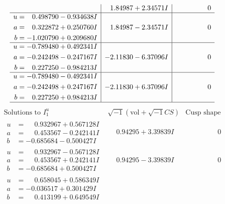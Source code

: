 \documentclass[1p]{elsarticle_modified}
\theoremstyle{definition}
\newcommand{\I}{\sqrt{-1}}
\begin{document}
$$\begin{array}{c|c|c}
 & \phantom{-}1.84987 + 2.34571 I & \phantom{-0.000000 } 0 \\ \hline\begin{aligned}
u &= \phantom{-}0.498790 - 0.934638 I \\
a &= \phantom{-}0.322872 + 0.250760 I \\
b &= -1.020790 + 0.209680 I\end{aligned}
 & \phantom{-}1.84987 - 2.34571 I & \phantom{-0.000000 } 0 \\ \hline\begin{aligned}
u &= -0.789480 + 0.492341 I \\
a &= -0.242498 - 0.247167 I \\
b &= \phantom{-}0.227250 - 0.984213 I\end{aligned}
 & -2.11830 - 6.37096 I & \phantom{-0.000000 } 0 \\ \hline\begin{aligned}
u &= -0.789480 - 0.492341 I \\
a &= -0.242498 + 0.247167 I \\
b &= \phantom{-}0.227250 + 0.984213 I\end{aligned}
 & -2.11830 + 6.37096 I & \phantom{-0.000000 } 0\\
 \hline 
 \end{array}$$\newpage$$\begin{array}{c|c|c}  
\text{Solutions to }I^u_{1}& \I (\text{vol} + \sqrt{-1}CS) & \text{Cusp shape}\\
 \hline 
\begin{aligned}
u &= \phantom{-}0.932967 + 0.567128 I \\
a &= \phantom{-}0.453567 - 0.242141 I \\
b &= -0.685684 - 0.500427 I\end{aligned}
 & \phantom{-}0.94295 + 3.39839 I & \phantom{-0.000000 } 0 \\ \hline\begin{aligned}
u &= \phantom{-}0.932967 - 0.567128 I \\
a &= \phantom{-}0.453567 + 0.242141 I \\
b &= -0.685684 + 0.500427 I\end{aligned}
 & \phantom{-}0.94295 - 3.39839 I & \phantom{-0.000000 } 0 \\ \hline\begin{aligned}
u &= \phantom{-}0.658045 + 0.586349 I \\
a &= -0.036517 + 0.301429 I \\
b &= \phantom{-}0.413199 + 0.649549 I\end{aligned}

\end{array}$$
\end{document}
